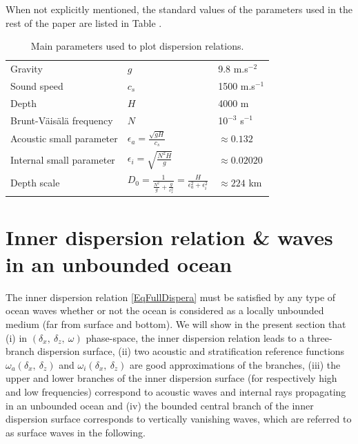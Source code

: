 \documentclass[a4paper,11pt]{article}
\begin{document}
When not explicitly mentioned, the standard values of the parameters used in the rest of the paper are listed in Table .
\begin{table}[h]
	\begin{center}
	\begin{tabular}{lll}
		Gravity&$g$&9.8 m.s$^{-2}$\\
		Sound speed&$c_s$&1500 m.s$^{-1}$\\
		Depth&$H$&4000 m\\
		Brunt-V\"ais\"al\"a frequency&$N$&10$^{-3}$ s$^{-1}$\\
		Acoustic small parameter&$\displaystyle \epsilon_a=\frac{\sqrt{gH}}{c_s}$&$\approx 		0.132$\\[4mm]
		Internal small parameter&$\displaystyle \epsilon_i=\sqrt{\frac{N^2H}{g}}$&$\approx 				0.02020$\\[4mm]
		Depth scale &$\displaystyle D_0=\frac{1}{\frac{N^2}{g}+\frac{g}{c_s^2}}
		=\frac{H}						{\epsilon_a^2+\epsilon_i^2}$
		&$\approx 224$ km
	\end{tabular}
	\end{center}
	\caption{Main parameters used to plot dispersion relations.}
	\label{TableParameters}
\end{table}

\section{Inner dispersion relation \& waves in an unbounded ocean}
\label{SectionInner}
The inner dispersion relation \ref{EqFullDispera} must be satisfied by any type of ocean waves whether or not the ocean is considered as a locally unbounded medium (far from surface and bottom). We will show in the present section that (i) in $(\delta_x,\  \delta_z,\ \omega)$ phase-space, the inner dispersion relation leads to a three-branch dispersion surface, (ii) two acoustic and stratification reference functions $\omega_a(\delta_x,\ \delta_z)$ and $\omega_i(\delta_x,\ \delta_z)$ are good approximations of the branches, (iii) the upper and lower branches of the inner dispersion surface (for respectively high and low frequencies) correspond to acoustic waves and internal rays propagating in an unbounded ocean and (iv) the bounded central branch of the inner dispersion surface corresponds to vertically vanishing waves, which are referred to as surface waves in the following.
\end{document}
